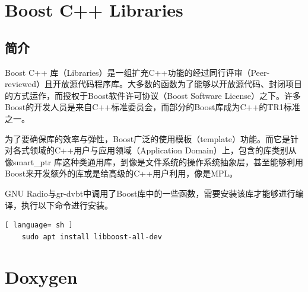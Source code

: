 \section{Boost C++ Libraries}
	\subsection{简介}
	\par Boost C++ 库（Libraries）是一组扩充C++功能的经过同行评审（Peer-reviewed）且开放源代码程序库。大多数的函数为了能够以开放源代码、封闭项目的方式运作，而授权于Boost软件许可协议（Boost Software License）之下。许多Boost的开发人员是来自C++标准委员会，而部分的Boost库成为C++的TR1标准之一。
	\par 为了要确保库的效率与弹性，Boost广泛的使用模板（template）功能。而它是针对各式领域的C++用户与应用领域（Application Domain）上，包含的库类别从像smart\_ptr 库这种类通用库，到像是文件系统的操作系统抽象层，甚至能够利用Boost来开发额外的库或是给高级的C++用户利用，像是MPL。\cite{ wiki:Boost}
	\par GNU Radio与gr-dvbt中调用了Boost库中的一些函数，需要安装该库才能够进行编译，执行以下命令进行安装。
	\begin{lstlisting}[ language= sh ]
	sudo apt install libboost-all-dev
	\end{lstlisting}
\section{Doxygen}
